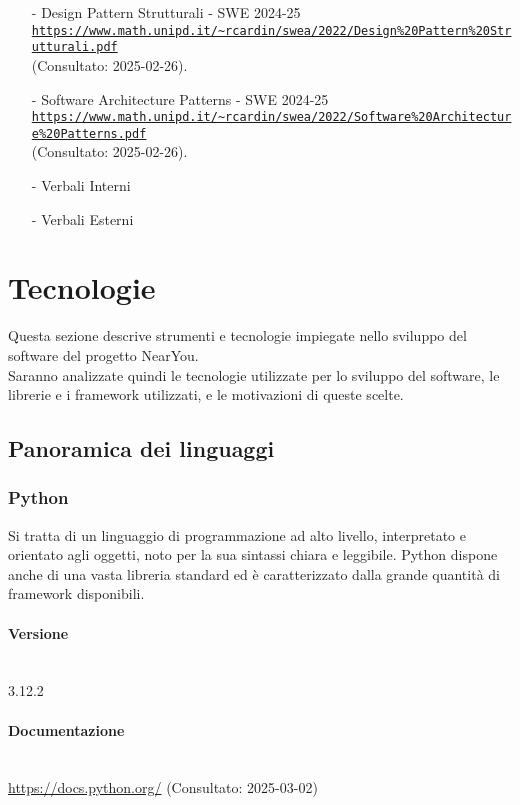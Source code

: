 \documentclass[10pt]{article}
\newcommand{\myparagraph}[1]{\paragraph{#1}\mbox{}\\\vspace{0.4em}}
\begin{document}
\begin{justify}
\begin{itemize}
    \item[-] Design Pattern Strutturali - SWE 2024-25\\
    \textcolor{blue}{\texttt{\url{https://www.math.unipd.it/\~rcardin/swea/2022/Design\%20Pattern\%20Strutturali.pdf}}}\\ (Consultato: 2025-02-26).
    
    \item[-] Software Architecture Patterns - SWE 2024-25\\
    \textcolor{blue}{\texttt{\url{https://www.math.unipd.it/\~rcardin/swea/2022/Software\%20Architecture\%20Patterns.pdf}}}\\ (Consultato: 2025-02-26).
    
    \item[-] Verbali Interni
    \item[-] Verbali Esterni
\end{itemize}

\section{Tecnologie}
Questa sezione descrive strumenti e tecnologie impiegate nello sviluppo del software del progetto NearYou.\\
Saranno analizzate quindi le tecnologie utilizzate per lo sviluppo del software, le librerie e i framework utilizzati, e le motivazioni di queste scelte.\\

\subsection{Panoramica dei linguaggi}
\label{sec:linguaggi}
    \subsubsection{Python}
        Si tratta di un linguaggio di programmazione ad alto livello, interpretato e orientato agli oggetti, noto per la sua sintassi chiara e leggibile. Python dispone
        anche di una vasta libreria standard ed è caratterizzato dalla grande quantità di framework disponibili.\\
        \myparagraph{Versione}
            3.12.2
        \myparagraph{Documentazione}
                 \textcolor{blue}{\url{https://docs.python.org/}} (Consultato: 2025-03-02)

\end{justify}
\end{document}
